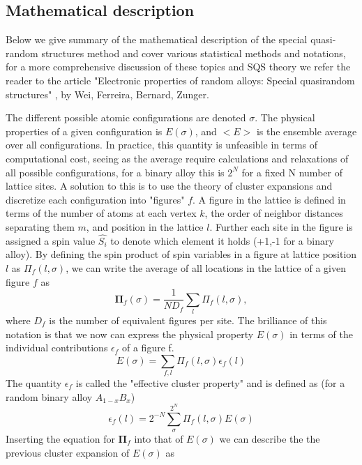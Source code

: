\subsection{Mathematical description}

Below we give summary of the mathematical description of the special quasi-random structures method and cover various statistical methods and notations, for a more comprehensive discussion of these topics and SQS theory we refer the reader to the article "Electronic properties of random alloys: Special quasirandom structures" \cite{sqsfull}, by Wei, Ferreira, Bernard, Zunger.  

The different possible atomic configurations are denoted $\sigma$. The physical properties of a given configuration is $E(\sigma)$, and $<E>$ is the ensemble average over all configurations. In practice, this quantity is unfeasible in terms of computational cost, seeing as the average require calculations and relaxations of all possible configurations, for a binary alloy this is $2^N$ for a fixed N number of lattice sites. A solution to this is to use the theory of cluster expansions and discretize each configuration into "figures" $f$. A figure in the lattice is defined in terms of the number of atoms at each vertex $k$, the order of neighbor distances separating them $m$, and position in the lattice $l$. Further each site in the figure is assigned a spin value $\hat{S_i}$ to denote which element it holds (+1,-1 for a binary alloy). By defining the spin product of spin variables in a figure at lattice position $l$ as $\Pi_f(l, \sigma)$, we can write the average of all locations in the lattice of a given figure $f$ as
\begin{equation}
    \boldsymbol{\Pi}_f(\sigma) = \frac{1}{ND_f} \sum_l \Pi_f (l,\sigma),
\end{equation}
where $D_f$ is the number of equivalent figures per site. The brilliance of this notation is that we now can express the physical property $E(\sigma)$ in terms of the individual contributions $\epsilon_f$ of a figure f.
\begin{equation}
    E(\sigma) = \sum_{f,l} \Pi_f(l, \sigma) \epsilon_f(l)
\end{equation}
The quantity $\epsilon_f$ is called the "effective cluster property" and is defined as (for a random binary alloy $A_{1-x}B_x$)
\begin{equation}
    \epsilon_f(l) = 2^{-N}\sum_\sigma^{2^N} \Pi_f (l,\sigma) E(\sigma)
\end{equation}
Inserting the equation for $\boldsymbol{\Pi}_f$ into that of $E(\sigma)$ we can describe the the previous cluster expansion of $E(\sigma)$ as
